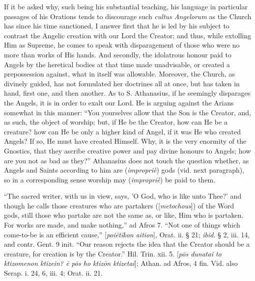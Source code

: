 If it be asked why, such being his substantial
teaching, his language in particular passages of his Orations tends to
discourage such \emph{cultus Angelorum} as the Church has since his
time sanctioned, I answer first that he is led by his subject to
contrast the Angelic creation with our Lord the Creator; and thus,
while extolling Him as Supreme, he comes to speak with disparagement
of those who were no more than works of His hands. And secondly, the
idolatrous honour paid to Angels by the heretical bodies at that time
made unadvisable, or created a prepossession against, what in itself
was allowable. Moreover, the Church, as divinely guided, has not
formulated her doctrines all at once, but has taken in hand, first
one, and then another. As to S. Athanasius, if he seemingly disparages
the Angels, it is in order to exalt our Lord. He is arguing against
the Arians somewhat in this manner: ``You yourselves allow that the
Son is the Creator, and, as such, the object of worship; but, if He be
the Creator, how can He be a creature? how can He be only a higher
kind of Angel, if it was He who created Angels? If so, He must have
created Himself. Why, it is the very enormity of the Gnostics, that
they ascribe creative power and pay divine honours to Angels; how are
you not as bad as they?'' Athanasius does not touch the question
whether, as Angels and Saints according to him are (\emph{impropriè})
gods (vid. next paragraph), so in a corresponding sense worship may (\emph{impropriè})
be paid to them.

``The sacred writer, with us in view, says, 'O
God, who is like unto Thee?' and though he calls those creatures who
are partakers ([\emph{metochous}]) of the Word gods, still those who
partake are not the same as, or like, Him who is partaken. For works
are made, and make nothing,'' ad Afros 7. ``Not one of things which
come-to-be is an efficient cause,'' [\emph{poi\={e}tikon aition}],
Orat. ii. § 21; \emph{ibid}. § 2, iii. 14, and contr. Gent. 9 init. ``Our
reason rejects the idea that the Creator should be a creature, for
creation is by the Creator.'' Hil. Trin. xii. 5. [\emph{p\={o}s dunatai
to ktizomenon ktizein? \={e} p\={o}s ho ktiz\={o}n ktizetai}];
Athan. ad Afros, 4 fin. Vid. also Serap. i. 24, 6, iii. 4; Orat. ii.
21.


